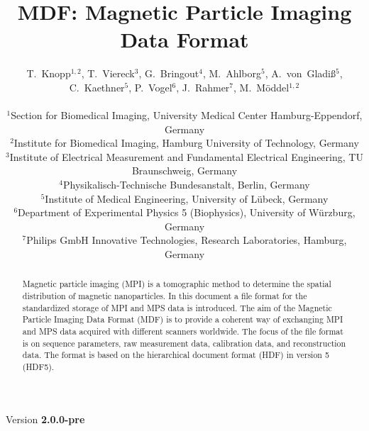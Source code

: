 \documentclass[landscape,a4paper]{article} %
\begin{document}
\title{MDF: Magnetic Particle Imaging Data Format}
\newcommand{\version}{2.0.0-pre}

\author{
T.~Knopp$^{1,2}$, T.~Viereck$^3$, G.~Bringout$^4$, M.~Ahlborg$^5$, A.~von~Gladi\ss$^5$, C.~Kaethner$^5$, P.~Vogel$^6$, J.~Rahmer$^7$, M.~M\"oddel$^{1,2}$ \\ \\
$^1$Section for Biomedical Imaging, University Medical Center Hamburg-Eppendorf, Germany\\
$^2$Institute for Biomedical Imaging, Hamburg University of Technology, Germany\\
$^3$Institute of Electrical Measurement and Fundamental Electrical Engineering, TU Braunschweig, Germany\\
$^4$Physikalisch-Technische Bundesanstalt, Berlin, Germany\\
$^5$Institute of Medical Engineering, University of  Lübeck, Germany\\
$^6$Department of Experimental Physics 5 (Biophysics), University of Würzburg, Germany\\
$^7$Philips GmbH Innovative Technologies, Research Laboratories, Hamburg, Germany
}

\maketitle
\begin{center}
Version \textbf{\version}
\end{center}

\begin{abstract}
Magnetic particle imaging (MPI) is a tomographic method to determine the spatial distribution of magnetic nanoparticles. In this document a file format for the standardized storage of MPI and MPS data is introduced. The aim of the Magnetic Particle Imaging Data Format (MDF) is to provide a coherent way of exchanging MPI and MPS data acquired with different scanners worldwide. The focus of the file format is on sequence parameters, raw measurement data, calibration data, and reconstruction data. The format is based on the hierarchical document format (HDF) in version 5 (HDF5).
\end{abstract}
\end{document}
